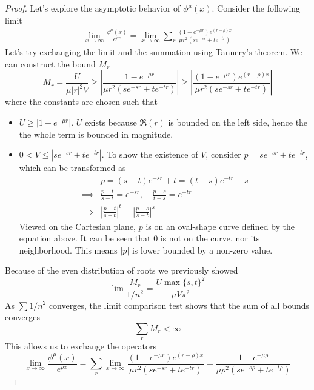 \documentclass[]{article}
\begin{document}
\begin{proof}
Let's explore the asymptotic behavior of $\phi^{\mu}(x)$. Consider the following limit
\begin{align*}
\lim_{x\to\infty}\frac{\phi^{\mu}(x)}{e^{\rho x}} = \lim_{x\to\infty}\sum_{r} \frac{(1-e^{-\mu r})e^{(r-\rho)x}}{\mu r^2(se^{-sr}+te^{-tr})}
\end{align*}
Let's try exchanging the limit and the summation using Tannery's theorem. We can construct the bound $M_r$ 
\[
M_r = \frac{U}{\mu |r|^2 V}\ge \left| \frac{1-e^{-\mu r}}{\mu r^2(se^{-sr}+te^{-tr})} \right| \ge \left| \frac{(1-e^{-\mu r})e^{(r-\rho)x}}{\mu r^2(se^{-sr}+te^{-tr})} \right|
\]
where the constants are chosen such that
\begin{itemize}
	\item $U \ge |1-e^{-\mu r}|$. $U$ exists because $\Re(r)$ is bounded on the left side, hence the the whole term is bounded in magnitude.
	\item $0 < V \le |se^{-sr}+te^{-tr}|$. To show the existence of $V$, consider $p = se^{-sr}+te^{-tr}$, which can be transformed as
	\begin{align*}
	&p = (s-t)e^{-sr} + t = (t-s)e^{-tr} + s\\
	\implies& \frac{p-t}{s-t} = e^{-sr}, \quad \frac{p-s}{t-s} = e^{-tr}\\
	\implies& \left|\frac{p-t}{s-t}\right|^t = \left|\frac{p-s}{s-t}\right|^s
	\end{align*}
	Viewed on the Cartesian plane, $p$ is on an oval-shape curve defined by the equation above. It can be seen that $0$ is not on the curve, nor its neighborhood. This means $|p|$ is lower bounded by a non-zero value.
\end{itemize}
Because of the even distribution of roots we previously showed
\[
	\lim \frac{M_r}{1/n^2} = \frac{U \max\{s,t\}^2}{\mu V \pi^2}
\]
As $\sum 1/n^2$ converges, the limit comparison test shows that the sum of all bounds converges
\[
\sum_{r} M_r < \infty
\]
This allows us to exchange the operators
\[
\lim_{x\to\infty}\frac{\phi^{\mu}(x)}{e^{\rho x}} =\sum_{r}  \lim_{x\to\infty}\frac{(1-e^{-\mu r})e^{(r-\rho)x}}{\mu r^2(se^{-sr}+te^{-tr})} = \frac{1-e^{-\mu \rho}}{\mu \rho^2(se^{-s\rho}+te^{-t\rho})}
\]


\end{proof}
\end{document}
